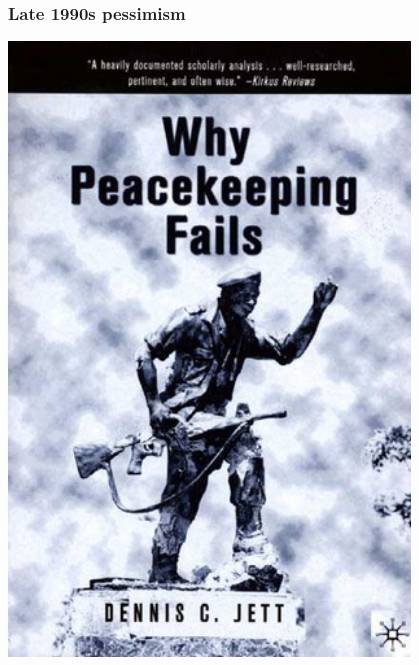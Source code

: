 \documentclass[aspectratio=43]{beamer}
\begin{document}
\begin{frame}
\frametitle{Late 1990s pessimism}
\centering

\begin{minipage}{0.49\textwidth}\centering
\includegraphics[width = 0.8\textwidth]{img/why-pk-fails}\\
\end{minipage}\hfill
\begin{minipage}{0.49\textwidth}\centering

\end{minipage}
\end{frame}
\end{document}
